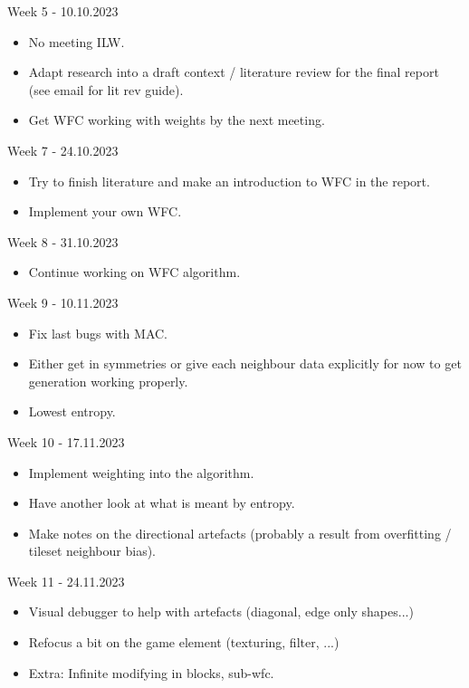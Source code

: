 \noindent Week 5 - 10.10.2023
\begin{itemize}
    \item No meeting ILW.
    \item Adapt research into a draft context / literature review for the final report (see email for lit rev guide).
    \item Get WFC working with weights by the next meeting.
\end{itemize}

\noindent Week 7 - 24.10.2023
\begin{itemize}
    \item Try to finish literature and make an introduction to WFC in the report.
    \item Implement your own WFC.
\end{itemize}

\noindent Week 8 - 31.10.2023
\begin{itemize}
    \item Continue working on WFC algorithm.
\end{itemize}

\noindent Week 9 - 10.11.2023
\begin{itemize}
    \item Fix last bugs with MAC.
    \item Either get in symmetries or give each neighbour data explicitly for now to get generation working properly.
    \item Lowest entropy.
\end{itemize}

\noindent Week 10 - 17.11.2023
\begin{itemize}
    \item Implement weighting into the algorithm.
    \item Have another look at what is meant by entropy.
    \item Make notes on the directional artefacts (probably a result from overfitting / tileset neighbour bias).
\end{itemize}

\noindent Week 11 - 24.11.2023
\begin{itemize}
    \item Visual debugger to help with artefacts (diagonal, edge only shapes...)
    \item Refocus a bit on the game element (texturing, filter, ...)
    \item Extra: Infinite modifying in blocks, sub-wfc.
\end{itemize}

